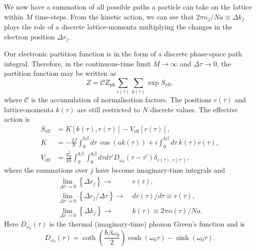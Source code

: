 We now have a summation of all possible paths a particle can take on the
lattice within $M$ time-steps. From the kinetic action, we can see that $2\pi n_j / N a \equiv \Delta k_j$ plays the role of a discrete lattice-momenta multiplying the changes in the electron position $\Delta r_j$. 

Our electronic partition function is in the form of a discrete phase-space path integral. Therefore, in the continuous-time limit $M \to \infty$ and $\Delta \tau \to 0$, the partition function may be written as 
\begin{equation}
    Z = \mathcal{C} Z_{\text{ph}} \sum_{r(\tau)} \sum_{k(\tau)} \exp{S_{\text{eff}}} ,
\end{equation}
where $\mathcal{C}$ is the accumulation of normalisation factors. The positions $r(\tau)$ and lattice-momenta $k(\tau)$ are still restricted to $N$ discrete values. The effective action is 
\begin{equation}
    \begin{aligned}
        S_{\text{eff}} &= K[k(\tau), r(\tau)] - V_{\text{eff}}[r(\tau)] , \\
        K &= -\frac{2J}{\hbar} \int_0^{\hbar\beta} d\tau\ \cos{\left(a k(\tau)\right)} + i \int_0^{\hbar\beta} d\tau\ k(\tau) \Dot{r}(\tau) , \\
        V_{\text{eff}} &= \frac{g_H^2}{4 \hbar} \int_0^{\hbar\beta} \int_0^{\hbar\beta} d\tau d\tau' D_{\omega_0}(\tau - \tau') \delta_{r(\tau), r(\tau')} ,
    \end{aligned}
\end{equation}
where the summations over $j$ have become imaginary-time integrals and 
\begin{equation}
    \begin{aligned}
        \lim_{\Delta\tau \to 0} \left\{\Delta r_j\right\} \rightarrow\ & 
            r(\tau) , \\
        \lim_{\Delta\tau \to 0} \left\{\Delta r_j / \Delta \tau\right\} \rightarrow\ & 
            d r(\tau) / d\tau \equiv \Dot{r}(\tau), \\
        \lim_{\Delta\tau \to 0} \left\{\Delta k_j \right\} \rightarrow\
            & k(\tau) \equiv 2\pi n(\tau) / N a . 
    \end{aligned}
\end{equation}
Here $D_{\omega_0}(\tau)$ is the thermal (imaginary-time) phonon Green's function and is
\begin{equation} \label{eqn:phonongf}
    D_{\omega_0}(\tau) = \coth(\frac{\hbar\beta\omega_0}{2}) \cosh(\omega_0 \tau) - \sinh(\omega_0\tau).
\end{equation}
